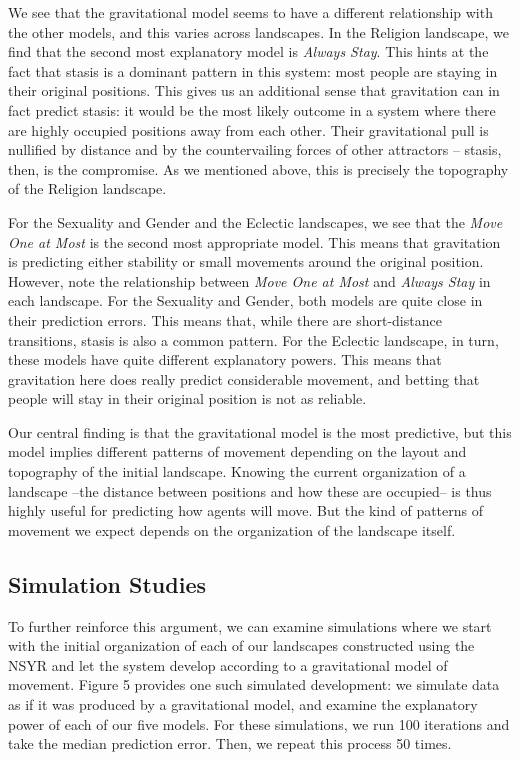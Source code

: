 \documentclass[
  11pt,
]{article}
\begin{document}
We see that the gravitational model seems to have a different
relationship with the other models, and this varies across landscapes.
In the Religion landscape, we find that the second most explanatory
model is \emph{Always Stay}. This hints at the fact that stasis is a
dominant pattern in this system: most people are staying in their
original positions. This gives us an additional sense that gravitation
can in fact predict stasis: it would be the most likely outcome in a
system where there are highly occupied positions away from each other.
Their gravitational pull is nullified by distance and by the
countervailing forces of other attractors -- stasis, then, is the
compromise. As we mentioned above, this is precisely the topography of
the Religion landscape.

For the Sexuality and Gender and the Eclectic landscapes, we see that
the \emph{Move One at Most} is the second most appropriate model. This
means that gravitation is predicting either stability or small movements
around the original position. However, note the relationship between
\emph{Move One at Most} and \emph{Always Stay} in each landscape. For
the Sexuality and Gender, both models are quite close in their
prediction errors. This means that, while there are short-distance
transitions, stasis is also a common pattern. For the Eclectic
landscape, in turn, these models have quite different explanatory
powers. This means that gravitation here does really predict
considerable movement, and betting that people will stay in their
original position is not as reliable.

Our central finding is that the gravitational model is the most
predictive, but this model implies different patterns of movement
depending on the layout and topography of the initial landscape. Knowing
the current organization of a landscape --the distance between positions
and how these are occupied-- is thus highly useful for predicting how
agents will move. But the kind of patterns of movement we expect depends
on the organization of the landscape itself.

\hypertarget{simulation-studies}{%
\subsection{Simulation Studies}\label{simulation-studies}}

To further reinforce this argument, we can examine simulations where we
start with the initial organization of each of our landscapes
constructed using the NSYR and let the system develop according to a
gravitational model of movement. Figure 5 provides one such simulated
development: we simulate data as if it was produced by a gravitational
model, and examine the explanatory power of each of our five models. For
these simulations, we run 100 iterations and take the median prediction
error. Then, we repeat this process 50 times.
\end{document}
